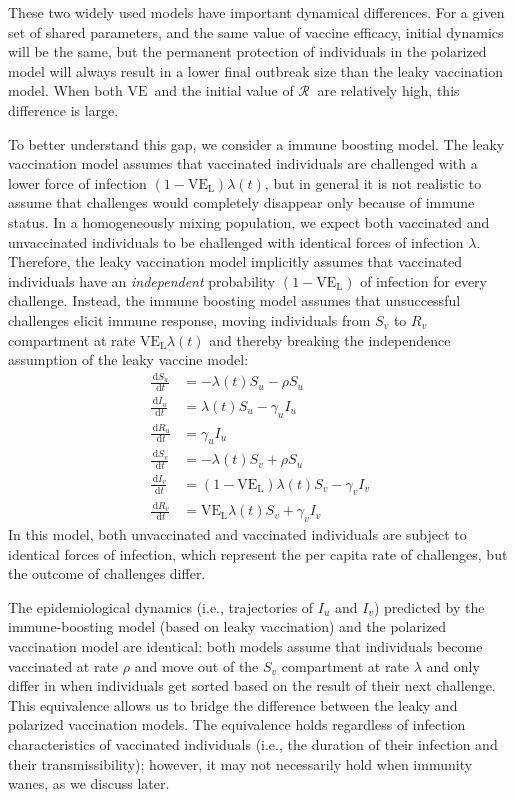 \documentclass[12pt]{article}
\newcommand{\Rx}[1]{\ensuremath{{\mathcal R}_{#1}}\xspace}
\newcommand{\dd}[1]{\ensuremath{\, \mathrm{d}#1}}
\newcommand{\VE}{\ensuremath{\mathrm{VE}}}
\newcommand{\VEL}{\ensuremath{\VE_{\mathrm{L}}}}
\begin{document}
These two widely used models have important dynamical differences. For a given set of shared parameters, and the same value of vaccine efficacy, initial dynamics will be the same, but the permanent protection of individuals in the polarized model will always result in a lower final outbreak size than the leaky vaccination model. When both \VE\ and the initial value of \Rx\ are relatively high, this difference is large.

To better understand this gap, we consider a immune boosting model.
The leaky vaccination model assumes that vaccinated individuals are challenged with a lower force of infection $(1-\VEL) \lambda(t)$, but in general it is not realistic to assume that challenges would completely disappear only because of immune status.
In a homogeneously mixing population, we expect both vaccinated and unvaccinated individuals to be challenged with identical forces of infection $\lambda$.
Therefore, the leaky vaccination model implicitly assumes that vaccinated individuals have an \emph{independent} probability $(1-\VEL)$ of infection for every challenge.
Instead, the immune boosting model assumes that unsuccessful challenges elicit immune response, moving individuals from $S_v$ to $R_v$ compartment at rate $\VEL \lambda(t)$ and thereby breaking the independence assumption of the leaky vaccine model:  
\begin{align}
\frac{\dd S_u}{\dd t} &= - \lambda(t) S_u - \rho S_u \\
\frac{\dd I_u}{\dd t} &= \lambda(t) S_u - \gamma_u I_u \\
\frac{\dd R_u}{\dd t} &= \gamma_u I_u \\
\frac{\dd S_v}{\dd t} &= - \lambda(t) S_v + \rho S_u \\
\frac{\dd I_v}{\dd t} &= (1-\VEL) \lambda(t) S_v - \gamma_v I_v \\
\frac{\dd R_v}{\dd t} &= \VEL \lambda(t) S_v + \gamma_v I_v
\end{align}
In this model, both unvaccinated and vaccinated individuals are subject to identical forces of infection, which represent the per capita rate of challenges, but the outcome of challenges differ.

The epidemiological dynamics (i.e., trajectories of $I_u$ and $I_v$) predicted by the immune-boosting model (based on leaky vaccination) and the polarized vaccination model are identical: 
both models assume that individuals become vaccinated at rate $\rho$ and move out of the $S_v$ compartment at rate $\lambda$ and only differ in when individuals get sorted based on the result of their next challenge.
This equivalence allows us to bridge the difference between the leaky and polarized vaccination models.
The equivalence holds regardless of infection characteristics of vaccinated individuals (i.e., the duration of their infection and their transmissibility);
however, it may not necessarily hold when immunity wanes, as we discuss later.
\end{document}
